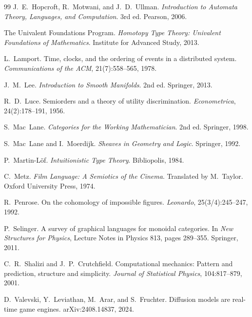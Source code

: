 \begin{thebibliography}{99}
 J.~E.~Hopcroft, R.~Motwani, and J.~D.~Ullman. \emph{Introduction to Automata Theory, Languages, and Computation}. 3rd ed. Pearson, 2006.

 The Univalent Foundations Program. \emph{Homotopy Type Theory: Univalent Foundations of Mathematics}. Institute for Advanced Study, 2013.

 L.~Lamport. Time, clocks, and the ordering of events in a distributed system. \emph{Communications of the ACM}, 21(7):558--565, 1978.

 J.~M.~Lee. \emph{Introduction to Smooth Manifolds}. 2nd ed. Springer, 2013.

 R.~D.~Luce. Semiorders and a theory of utility discrimination. \emph{Econometrica}, 24(2):178--191, 1956.

 S.~Mac~Lane. \emph{Categories for the Working Mathematician}. 2nd ed. Springer, 1998.

 S.~Mac~Lane and I.~Moerdijk. \emph{Sheaves in Geometry and Logic}. Springer, 1992.

 P.~Martin-L\"of. \emph{Intuitionistic Type Theory}. Bibliopolis, 1984.

 C.~Metz. \emph{Film Language: A Semiotics of the Cinema}. Translated by M.~Taylor. Oxford University Press, 1974.

 R.~Penrose. On the cohomology of impossible figures. \emph{Leonardo}, 25(3/4):245--247, 1992.

 P.~Selinger. A survey of graphical languages for monoidal categories. In \emph{New Structures for Physics}, Lecture Notes in Physics 813, pages 289--355. Springer, 2011.

 C.~R.~Shalizi and J.~P.~Crutchfield. Computational mechanics: Pattern and prediction, structure and simplicity. \emph{Journal of Statistical Physics}, 104:817--879, 2001.

 D.~Valevski, Y.~Leviathan, M.~Arar, and S.~Fruchter. Diffusion models are real-time game engines. arXiv:2408.14837, 2024.

\end{thebibliography}
